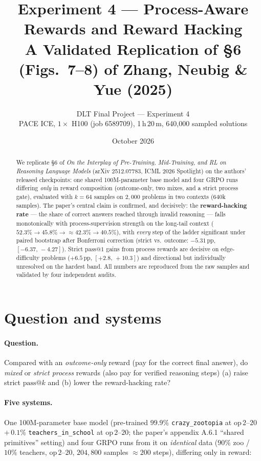 \documentclass[11pt]{article}
\title{\textbf{Experiment 4 — Process-Aware Rewards and Reward Hacking}\\[4pt]
\large A Validated Replication of \S6 (Figs.\ 7--8) of Zhang, Neubig \& Yue (2025)}
\author{DLT Final Project — Experiment 4\\[2pt]
\small PACE ICE, $1\times$ H100 (job 6589709), 1\,h\,20\,m, 640{,}000 sampled solutions}
\date{October 2026}
\makeatletter
\newcommand{\passk}[1]{\ensuremath{\mathrm{pass}@#1}}
\newcommand{\pp}{\,\mathrm{pp}}
\newcommand{\ci}[2]{\ensuremath{[#1,\,#2]}}
\makeatother
\begin{document}
\maketitle

\begin{abstract}
We replicate \S6 of \emph{On the Interplay of Pre-Training, Mid-Training, and RL on
Reasoning Language Models} (arXiv 2512.07783, ICML 2026 Spotlight) on the authors'
released checkpoints: one shared 100M-parameter base model and four GRPO runs differing
\emph{only} in reward composition (outcome-only, two mixes, and a strict process gate),
evaluated with $k{=}64$ samples on $2{,}000$ problems in two contexts ($640$k samples).
The paper's central claim is confirmed, and decisively: the \textbf{reward-hacking rate}
--- the share of correct answers reached through invalid reasoning --- falls
monotonically with process-supervision strength on the long-tail context
($52.3\% \to 45.8\% \to {\approx}42.3\% \to 40.5\%$), with \emph{every} step of the
ladder significant under paired bootstrap after Bonferroni correction (strict vs.\
outcome: $-5.31\pp$, \ci{-6.37}{-4.27}). Strict \passk{1} gains from process rewards
are decisive on edge-difficulty problems ($+6.5\pp$, \ci{+2.8}{+10.3}) and directional
but individually unresolved on the hardest band. All numbers are reproduced from the
raw samples and validated by four independent audits.
\end{abstract}

\section{Question and systems}

\paragraph{Question.} Compared with an \emph{outcome-only} reward (pay for the correct
final answer), do \emph{mixed} or \emph{strict process} rewards (also pay for verified
reasoning steps) (a) raise strict \passk{k} and (b) lower the reward-hacking rate?

\paragraph{Five systems.} One 100M-parameter base model (pre-trained $99.9\%$
\texttt{crazy\_zootopia} at $\mathrm{op}\,2$--$20$ $+\,0.1\%$ \texttt{teachers\_in\_school}
at $\mathrm{op}\,2$--$20$; the paper's appendix A.6.1 ``shared primitives'' setting) and
four GRPO runs from it on \emph{identical} data ($90\%$ zoo / $10\%$ teachers,
$\mathrm{op}\,2$--$20$, $204{,}800$ samples $\approx 200$ steps), differing only in
reward:
\end{document}

